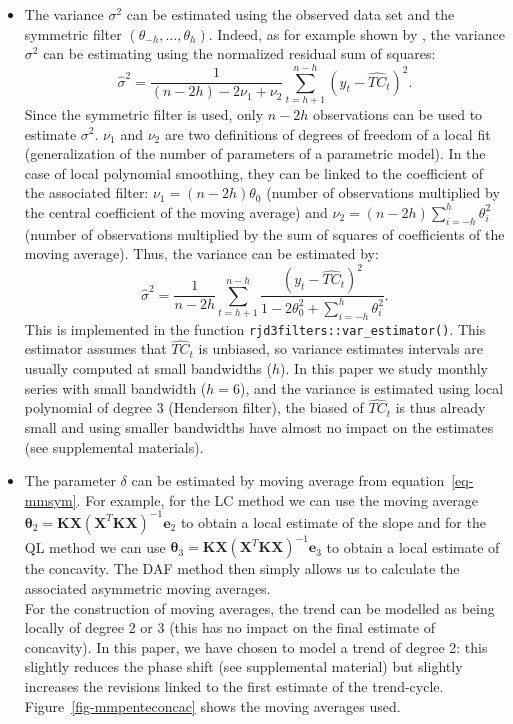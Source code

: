 \documentclass[
]{article}
\newcommand\transp[1]{{#1}^T}
\newcommand\1{\mathds{1}}
\begin{document}
\begin{itemize}
\item
  The variance \(\sigma^2\) can be estimated using the observed data set
  and the symmetric filter \((\theta_{-h},\dots,\theta_h)\). Indeed, as
  for example shown by \textcite{Loader1999}, the variance \(\sigma^2\)
  can be estimating using the normalized residual sum of squares: \[
  \hat\sigma^2=\frac{1}{(n-2h)-2\nu_1+\nu_2}\sum_{t=h+1}^{n-h}(y_t-\widehat{TC}_t)^2.
  \] Since the symmetric filter is used, only \(n-2h\) observations can
  be used to estimate \(\sigma^2\). \(\nu_1\) and \(\nu_2\) are two
  definitions of degrees of freedom of a local fit (generalization of
  the number of parameters of a parametric model). In the case of local
  polynomial smoothing, they can be linked to the coefficient of the
  associated filter: \(\nu_1 = (n-2h)\theta_0\) (number of observations
  multiplied by the central coefficient of the moving average) and
  \(\nu_2 = (n-2h)\sum_{i=-h}^{h} \theta_i^2\) (number of observations
  multiplied by the sum of squares of coefficients of the moving
  average). Thus, the variance can be estimated by: \[
  \hat\sigma^2=\frac{1}{n-2h}\sum_{t=h+1}^{n-h}\frac{(y_t-\widehat{TC}_t)^2}{1-2\theta_0^2+\sum_{i=-h}^{h} \theta_i^2}.
  \] This is implemented in the function
  \texttt{rjd3filters::var\_estimator()}. This estimator assumes that
  \(\widehat{TC}_t\) is unbiased, so variance estimates intervals are
  usually computed at small bandwidths (\(h\)). In this paper we study
  monthly series with small bandwidth (\(h=6\)), and the variance is
  estimated using local polynomial of degree 3 (Henderson filter), the
  biased of \(\widehat{TC}_t\) is thus already small and using smaller
  bandwidths have almost no impact on the estimates (see supplemental
  materials).
\item
  The parameter \(\delta\) can be estimated by moving average from
  equation~\ref{eq-mmsym}. For example, for the LC method we can use the
  moving average
  \(\boldsymbol \theta_2=\boldsymbol K\boldsymbol X(\transp{\boldsymbol X}\boldsymbol K\boldsymbol X)^{-1}\boldsymbol e_{2}\)
  to obtain a local estimate of the slope and for the QL method we can
  use
  \(\boldsymbol \theta_3=\boldsymbol K\boldsymbol X(\transp{\boldsymbol X}\boldsymbol K\boldsymbol X)^{-1}\boldsymbol e_{3}\)
  to obtain a local estimate of the concavity. The DAF method then
  simply allows us to calculate the associated asymmetric moving
  averages.\\
  For the construction of moving averages, the trend can be modelled as
  being locally of degree 2 or 3 (this has no impact on the final
  estimate of concavity). In this paper, we have chosen to model a trend
  of degree 2: this slightly reduces the phase shift (see supplemental
  material) but slightly increases the revisions linked to the first
  estimate of the trend-cycle. Figure~\ref{fig-mmpenteconcac} shows the
  moving averages used.
\end{itemize}
\end{document}
